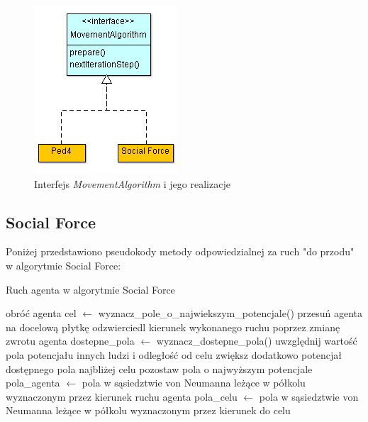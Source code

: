 \documentclass[a4paper, 12pt]{article}
\begin{document}
    \begin{figure}[H]
        \centering
        \includegraphics[scale=0.75]{./img/move_algos.png}
        \caption{Interfejs \emph{MovementAlgorithm} i jego realizacje}
        \label{fig:movealgo}
    \end{figure}

        \subsection{Social Force}
        \label{sec:social-force-impl}

Poniżej przedstawiono pseudokody metody odpowiedzialnej za ruch "do przodu" w algorytmie Social Force:

\begin{algorithm}
\caption{Ruch agenta w algorytmie Social Force}
\label{alg1}
\begin{algorithmic}
        \State obróć agenta
    \Else
        \State cel $\gets$ wyznacz\_pole\_o\_najwiekszym\_potencjale()
        \State przesuń agenta na docelową płytkę
        \State odzwierciedl kierunek wykonanego ruchu poprzez zmianę zwrotu agenta
    \EndIf
\EndProcedure
\newline
{}
    \State dostepne\_pola $\gets$ wyznacz\_dostepne\_pola()
        \State uwzględnij wartość pola potencjału innych ludzi i odległość od celu
    \EndFor
        \State zwiększ dodatkowo potencjał dostępnego pola najbliżej celu
    \EndIf
    \State pozostaw pola o najwyższym potencjale \\
\EndFunction
\newline
{}
    \State pola\_agenta $\gets$ pola w sąsiedztwie von Neumanna leżące w półkolu wyznaczonym przez kierunek ruchu agenta
    \State pola\_celu $\gets$ pola w sąsiedztwie von Neumanna leżące w półkolu wyznaczonym przez kierunek do celu \\
\EndFunction
\end{algorithmic}
\end{algorithm}
\end{document}
